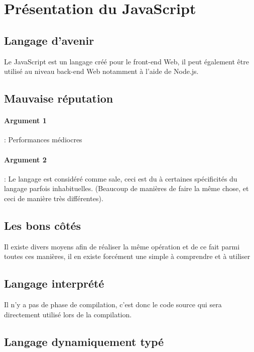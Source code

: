 \documentclass{article}[12pt]
\begin{document}


\tableofcontents%
\newpage

\section{Présentation du JavaScript}

\subsection{Langage d'avenir}

Le JavaScript est un langage créé pour le front-end Web, il peut également être utilisé au niveau back-end Web notamment à l'aide de Node.js.

\subsection{Mauvaise réputation}

\paragraph{Argument 1} : Performances médiocres

\paragraph{Argument 2} : Le langage est considéré comme sale, ceci est du à certaines {\color{blue}spécificités} du langage parfois inhabituelles. ({\color{blue}Beaucoup de manières de faire la même chose}, et ceci de manière très différentes).

\subsection{Les bons côtés}

Il existe divers moyens afin de réaliser la même opération et de ce fait parmi toutes ces manières, il en existe forcément {\color{blue} une simple à comprendre et à utiliser} 

\subsection{Langage interprété}

Il n'y a pas de phase de compilation, c'est donc le code source qui sera directement utilisé lors de la compilation.

\subsection{Langage dynamiquement typé}
\end{document}
